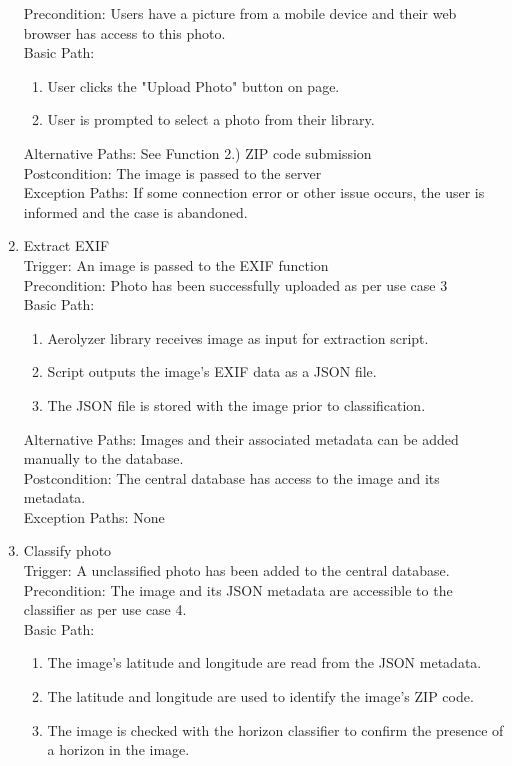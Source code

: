 \documentclass[journal,10pt,draftclsnofoot,onecolumn]{IEEEtran}
\begin{document}
\begin{singlespace}
\begin{enumerate}
Precondition: Users have a picture from a mobile device and their web browser has access to this photo.\\
Basic Path:\begin{enumerate}
\item User clicks the "Upload Photo" button on page.
\item User is prompted to select a photo from their library.
\end{enumerate}
Alternative Paths: See Function 2.) ZIP code submission\\
Postcondition: The image is passed to the server\\
Exception Paths: If some connection error or other issue occurs, the user is informed and the case is abandoned.
\\
\item Extract EXIF\\
Trigger: An image is passed to the EXIF function\\
Precondition: Photo has been successfully uploaded as per use case 3\\
Basic Path:\begin{enumerate} 
\item Aerolyzer library receives image as input for extraction script.
\item Script outputs the image's EXIF data as a JSON file.
\item The JSON file is stored with the image prior to classification.
\end{enumerate}
Alternative Paths: Images and their associated metadata can be added manually to the database.\\
Postcondition: The central database has access to the image and its metadata.\\
Exception Paths: None
\\
\item Classify photo\\
Trigger: A unclassified photo has been added to the central database.\\
Precondition: The image and its JSON metadata are accessible to the classifier as per use case 4.\\
Basic Path:\begin{enumerate}
\item The image's latitude and longitude are read from the JSON metadata.
\item The latitude and longitude are used to identify the image's ZIP code.
\item The image is checked with the horizon classifier to confirm the presence of a horizon in the image.

\end{enumerate}
\end{enumerate}
\end{singlespace}
\end{document}
